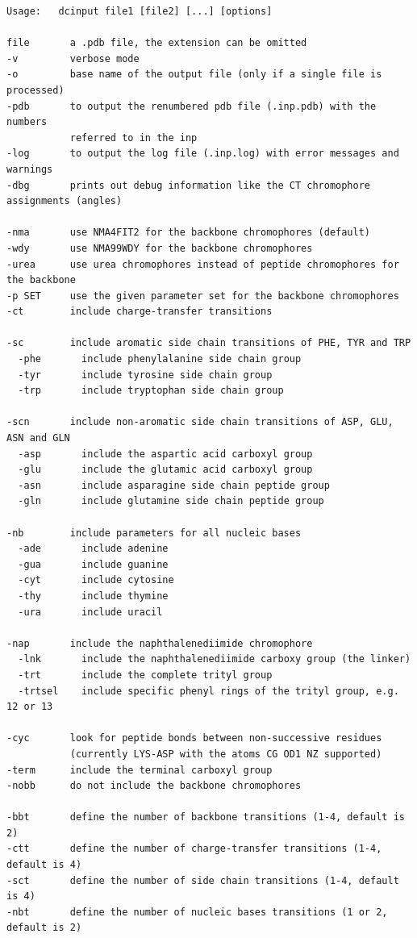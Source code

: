 \documentclass[11pt, letterpaper]{article}
\begin{document}
\enlargethispage{1em}
{\small
\begin{verbatim}
Usage:   dcinput file1 [file2] [...] [options]

file       a .pdb file, the extension can be omitted
-v         verbose mode
-o         base name of the output file (only if a single file is processed)
-pdb       to output the renumbered pdb file (.inp.pdb) with the numbers
           referred to in the inp
-log       to output the log file (.inp.log) with error messages and warnings
-dbg       prints out debug information like the CT chromophore assignments (angles)

-nma       use NMA4FIT2 for the backbone chromophores (default)
-wdy       use NMA99WDY for the backbone chromophores
-urea      use urea chromophores instead of peptide chromophores for the backbone
-p SET     use the given parameter set for the backbone chromophores
-ct        include charge-transfer transitions

-sc        include aromatic side chain transitions of PHE, TYR and TRP
  -phe       include phenylalanine side chain group
  -tyr       include tyrosine side chain group
  -trp       include tryptophan side chain group

-scn       include non-aromatic side chain transitions of ASP, GLU, ASN and GLN
  -asp       include the aspartic acid carboxyl group
  -glu       include the glutamic acid carboxyl group
  -asn       include asparagine side chain peptide group
  -gln       include glutamine side chain peptide group

-nb        include parameters for all nucleic bases
  -ade       include adenine
  -gua       include guanine
  -cyt       include cytosine
  -thy       include thymine
  -ura       include uracil

-nap       include the naphthalenediimide chromophore
  -lnk       include the naphthalenediimide carboxy group (the linker)
  -trt       include the complete trityl group
  -trtsel    include specific phenyl rings of the trityl group, e.g. 12 or 13

-cyc       look for peptide bonds between non-successive residues
           (currently LYS-ASP with the atoms CG OD1 NZ supported)
-term      include the terminal carboxyl group
-nobb      do not include the backbone chromophores

-bbt       define the number of backbone transitions (1-4, default is 2)
-ctt       define the number of charge-transfer transitions (1-4, default is 4)
-sct       define the number of side chain transitions (1-4, default is 4)
-nbt       define the number of nucleic bases transitions (1 or 2, default is 2)


\end{verbatim}}
\end{document}
